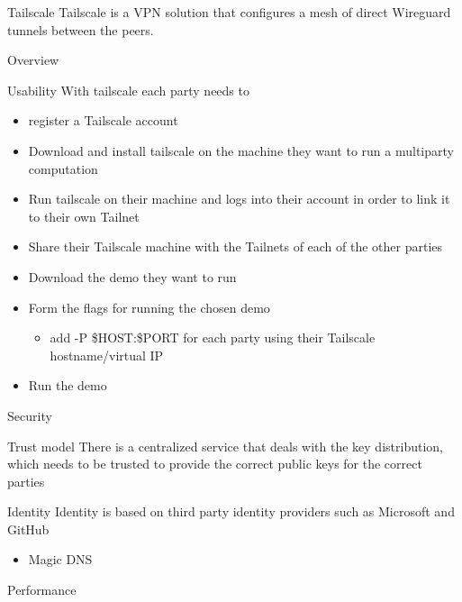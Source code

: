 \begin{frame}{Tailscale}
\protect\hypertarget{tailscale}{}
Tailscale is a VPN solution that configures a mesh of direct Wireguard
tunnels between the peers.

\begin{block}{Overview}
\protect\hypertarget{overview}{}
\end{block}

\begin{block}{Usability}
\protect\hypertarget{usability}{}
With tailscale each party needs to

\begin{itemize}
\tightlist
\item
  register a Tailscale account
\item
  Download and install tailscale on the machine they want to run a
  multiparty computation
\item
  Run tailscale on their machine and logs into their account in order to
  link it to their own Tailnet
\item
  Share their Tailscale machine with the Tailnets of each of the other
  parties
\item
  Download the demo they want to run
\item
  Form the flags for running the chosen demo

  \begin{itemize}
  \tightlist
  \item
    add -P \$HOST:\$PORT for each party using their Tailscale
    hostname/virtual IP
  \end{itemize}
\item
  Run the demo
\end{itemize}
\end{block}

\begin{block}{Security}
\protect\hypertarget{security}{}
\begin{block}{Trust model}
\protect\hypertarget{trust-model}{}
There is a centralized service that deals with the key distribution,
which needs to be trusted to provide the correct public keys for the
correct parties
\end{block}

\begin{block}{Identity}
\protect\hypertarget{identity}{}
Identity is based on third party identity providers such as Microsoft
and GitHub

\begin{itemize}
\tightlist
\item
  Magic DNS
\end{itemize}
\end{block}
\end{block}

\begin{block}{Performance}
\protect\hypertarget{performance}{}
\end{block}
\end{frame}
